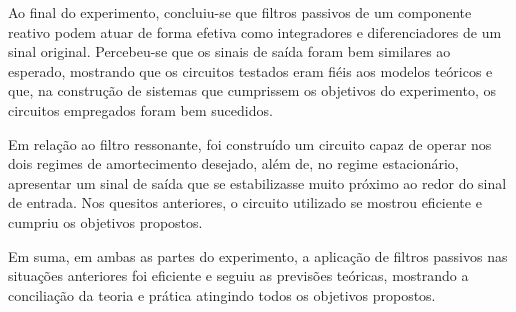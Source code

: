 Ao final do experimento, concluiu-se que filtros passivos de um componente reativo podem atuar de forma efetiva como integradores e diferenciadores de um sinal original. Percebeu-se que os sinais de saída foram bem similares ao esperado, mostrando que os circuitos testados eram fiéis aos modelos teóricos e que, na construção de sistemas que cumprissem os objetivos do experimento, os circuitos empregados foram bem sucedidos.

Em relação ao filtro ressonante, foi construído um circuito capaz de operar nos dois regimes de amortecimento desejado, além de, no regime estacionário, apresentar um sinal de saída que se estabilizasse muito próximo ao redor do sinal de entrada. Nos quesitos anteriores, o circuito utilizado se mostrou eficiente e cumpriu os objetivos propostos. 

Em suma, em ambas as partes do experimento, a aplicação de filtros passivos nas situações anteriores foi eficiente e seguiu as previsões teóricas, mostrando a conciliação da teoria e prática atingindo todos os objetivos propostos.